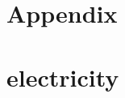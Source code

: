{\section*{Appendix}}

\appendix
\section{electricity}
\label{appendix:electricity:pca:1}
\label{appendix:electricity:pca:2}